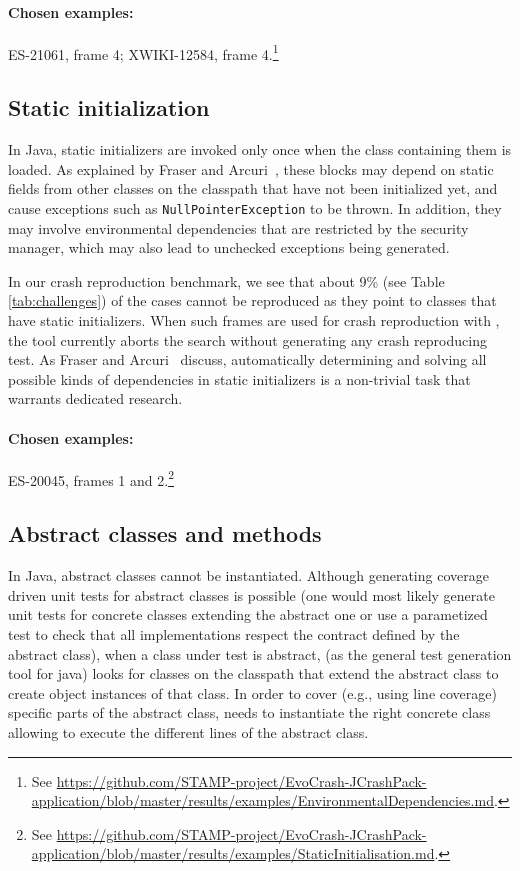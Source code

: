 \paragraph{Chosen examples:} 
ES-21061, frame 4;
XWIKI-12584, frame 4.\footnote{See \url{https://github.com/STAMP-project/EvoCrash-JCrashPack-application/blob/master/results/examples/EnvironmentalDependencies.md}.}


\subsection{Static initialization}

In Java, static initializers are invoked only once when the class containing them is loaded.
As explained by Fraser and Arcuri~\cite{Fraser2014b}, these blocks may depend on static fields from other classes on the classpath that have not been initialized yet, and cause exceptions such as \texttt{NullPointerException} to be thrown.
In addition, they may involve environmental dependencies that are restricted by the security manager, which may also lead to unchecked exceptions being generated.

In our crash reproduction benchmark, we see that about 9\% (see Table \ref{tab:challenges}) of the cases cannot be reproduced as they point to classes that have static initializers.
When such frames are used for crash reproduction with \evocrash, the tool currently aborts the search without generating any crash reproducing test.
%
As Fraser and Arcuri~\cite{Fraser2014b} discuss, automatically determining and solving all possible kinds of dependencies in static initializers is a non-trivial task that warrants dedicated research.

\paragraph{Chosen examples:} 
ES-20045, frames 1 and 2.\footnote{See \url{https://github.com/STAMP-project/EvoCrash-JCrashPack-application/blob/master/results/examples/StaticInitialisation.md}.}


\subsection{Abstract classes and methods}
\label{sec:categoryabstractclasses}

In Java, abstract classes cannot be instantiated.
Although generating coverage driven unit tests for abstract classes is possible (one would most likely generate unit tests for concrete classes extending the abstract one or use a parametized test to check that all implementations respect the contract defined by the abstract class), when a class under test is abstract, \evosuite (as the general test generation tool for java) looks for classes on the classpath that extend the abstract class to create object instances of that class. 
In order to cover (e.g., using line coverage) specific parts of the abstract class, \evosuite needs to instantiate the right concrete class allowing to execute the different lines of the abstract class. 

